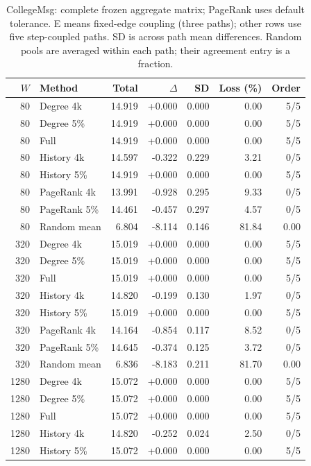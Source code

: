 \clearpage
\begin{table}[htbp]
\caption{CollegeMsg: complete frozen aggregate matrix; PageRank uses default tolerance. E means fixed-edge coupling (three paths); other rows use five step-coupled paths. SD is across path mean differences. Random pools are averaged within each path; their agreement entry is a fraction.}\label{tab:s-college_msg}
\begin{tabular}{rlrrrrr}
\toprule
$W$ & Method & Total & $\Delta$ & SD & Loss (\%) & Order \\
\midrule
80 & Degree 4k & 14.919 & +0.000 & 0.000 & 0.00 & 5/5 \\
80 & Degree 5\% & 14.919 & +0.000 & 0.000 & 0.00 & 5/5 \\
80 & Full & 14.919 & +0.000 & 0.000 & 0.00 & 5/5 \\
80 & History 4k & 14.597 & -0.322 & 0.229 & 3.21 & 0/5 \\
80 & History 5\% & 14.919 & +0.000 & 0.000 & 0.00 & 5/5 \\
80 & PageRank 4k & 13.991 & -0.928 & 0.295 & 9.33 & 0/5 \\
80 & PageRank 5\% & 14.461 & -0.457 & 0.297 & 4.57 & 0/5 \\
80 & Random mean & 6.804 & -8.114 & 0.146 & 81.84 & 0.00 \\
320 & Degree 4k & 15.019 & +0.000 & 0.000 & 0.00 & 5/5 \\
320 & Degree 5\% & 15.019 & +0.000 & 0.000 & 0.00 & 5/5 \\
320 & Full & 15.019 & +0.000 & 0.000 & 0.00 & 5/5 \\
320 & History 4k & 14.820 & -0.199 & 0.130 & 1.97 & 0/5 \\
320 & History 5\% & 15.019 & +0.000 & 0.000 & 0.00 & 5/5 \\
320 & PageRank 4k & 14.164 & -0.854 & 0.117 & 8.52 & 0/5 \\
320 & PageRank 5\% & 14.645 & -0.374 & 0.125 & 3.72 & 0/5 \\
320 & Random mean & 6.836 & -8.183 & 0.211 & 81.70 & 0.00 \\
1280 & Degree 4k & 15.072 & +0.000 & 0.000 & 0.00 & 5/5 \\
1280 & Degree 5\% & 15.072 & +0.000 & 0.000 & 0.00 & 5/5 \\
1280 & Full & 15.072 & +0.000 & 0.000 & 0.00 & 5/5 \\
1280 & History 4k & 14.820 & -0.252 & 0.024 & 2.50 & 0/5 \\
1280 & History 5\% & 15.072 & +0.000 & 0.000 & 0.00 & 5/5 \\

\end{tabular}
\end{table}
